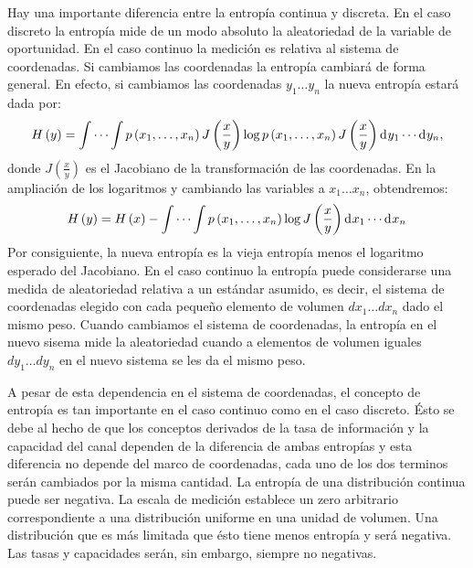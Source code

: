 \item{Hay una importante diferencia entre la entrop\'ia continua y discreta. En el caso discreto la entrop\'ia mide de un modo absoluto la aleatoriedad de la variable de oportunidad. En el caso continuo la medici\'on es relativa al sistema de coordenadas. Si cambiamos las coordenadas la entrop\'ia cambiar\'a de forma general. En efecto, si cambiamos las coordenadas $y_{1} \dots y_{n}$ la nueva entrop\'ia estar\'a dada por:
\begin{equation}
H\left ( y \right )=\int \cdots \int p\left ( x_{1}, \ldots ,x_{n} \right )J\left ( \frac{x}{y} \right )\log p\left ( x_{1}, \ldots ,x_{n} \right )J\left ( \frac{x}{y} \right ) \diff y _{1}\cdots  \diff y _{n},
\end{equation}
donde $J\left ( \frac{x}{y} \right )$ es el Jacobiano de la transformaci\'on de las coordenadas. En la ampliaci\'on de los logaritmos y cambiando las variables a $x_{1}\dots x_{n}$, obtendremos:
\begin{equation}
H\left ( y \right )=H\left ( x \right )-\int \cdots \int p\left ( x_{1}, \ldots ,x_{n} \right )\log J \left ( \frac{x}{y} \right ) \diff x _{1}\cdots  \diff x _{n}
\end{equation}
Por consiguiente, la nueva entrop\'ia es la vieja entrop\'ia menos el logaritmo esperado del Jacobiano. En el caso continuo la entrop\'ia puede considerarse una medida de aleatoriedad relativa a un est\'andar asumido, es decir, el sistema de coordenadas elegido con cada peque\~no elemento de volumen $dx_{1}\dots dx_{n}$ dado el mismo peso. Cuando cambiamos el sistema de coordenadas, la entrop\'ia en el nuevo sisema mide la aleatoriedad cuando a elementos de volumen iguales $dy_{1}\dots dy_{n}$ en el nuevo sistema se les da el mismo peso.

A pesar de esta dependencia en el sistema de coordenadas, el concepto de entrop\'ia es tan importante en el caso continuo como en el caso discreto. \'Esto se debe al hecho de que los conceptos derivados de la tasa de informaci\'on y la capacidad del canal dependen de la diferencia de ambas entrop\'ias y esta diferencia no depende del marco de coordenadas, cada uno de los dos terminos ser\'an cambiados por la misma cantidad.
La entrop\'ia de una distribuci\'on continua puede ser negativa. La escala de medici\'on establece un zero arbitrario correspondiente a una distribuci\'on uniforme en una unidad de volumen. Una distribuci\'on que es m\'as limitada que \'esto tiene menos entrop\'ia y ser\'a negativa. Las tasas y capacidades ser\'an, sin embargo, siempre no negativas.}

